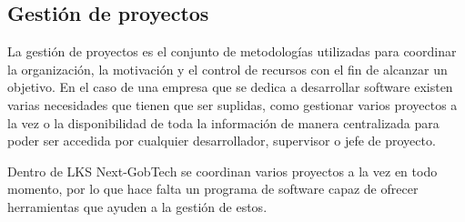 \subsection{Gestión de proyectos}

La gestión de proyectos es el conjunto de metodologías utilizadas para coordinar la organización, la motivación y el control de recursos con el fin de alcanzar un objetivo. En el caso de una empresa que se dedica a desarrollar software existen varias necesidades que tienen que ser suplidas, como gestionar varios proyectos a la vez o la disponibilidad de toda la información de manera centralizada para poder ser accedida por cualquier desarrollador, supervisor o jefe de proyecto.

Dentro de LKS Next-GobTech se coordinan varios proyectos a la vez en todo momento, por lo que hace falta un programa de software capaz de ofrecer herramientas que ayuden a la gestión de estos. 

